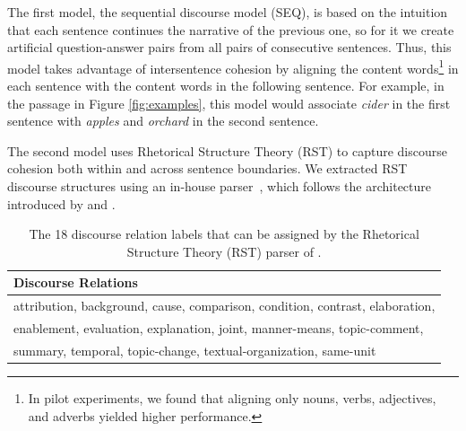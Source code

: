 The first model, the sequential discourse model (SEQ), is based on the intuition that each sentence continues the narrative of the previous one, so for it we create artificial question-answer pairs from all pairs of consecutive sentences.
Thus, this model takes advantage of intersentence cohesion by aligning the content words\footnote{In pilot experiments, we found that aligning only nouns, verbs, adjectives, and adverbs yielded higher performance.} in each sentence with the content words in the following sentence.  For example, in the passage in Figure \ref{fig:examples}, this model would associate \emph{cider} in the first sentence with \emph{apples} and \emph{orchard} in the second sentence.

The second model uses Rhetorical Structure Theory (RST) to capture discourse cohesion both within and across sentence boundaries.  
We extracted RST discourse structures using an in-house parser~\citep{Surdeanu:15}, which follows the architecture introduced by \citet{hernault10} and \citet{feng12}.

\begin{table}[t!]
\begin{center}
\begin{tabular}{l}
\toprule
\textbf{Discourse Relations}  \\
\midrule
attribution, background, cause, comparison, condition, contrast, elaboration,\\ enablement, evaluation, explanation, joint, manner-means, topic-comment,\\ summary, temporal, topic-change, textual-organization, same-unit\\
\end{tabular}
\caption{ \label{tab:rst} 
The 18 discourse relation labels that can be assigned by the Rhetorical Structure Theory (RST) parser of \citet{Surdeanu:15}.
}

\end{center}
\end{table}

